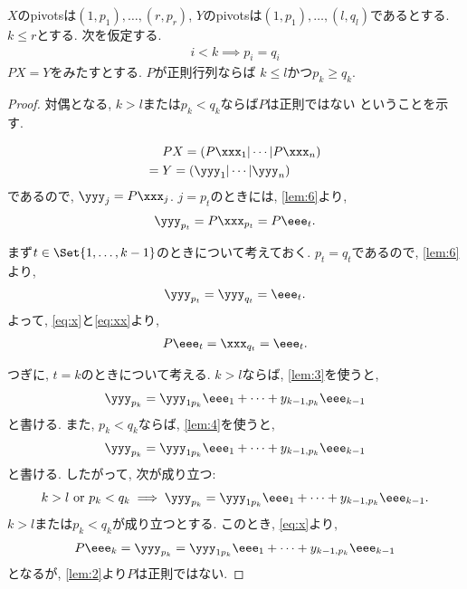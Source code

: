 \begin{lemma}
  \label{lem:8}
  $X$のpivotsは$(1,p_1),\ldots,(r,p_r)$,
  $Y$のpivotsは$(1,p_1),\ldots,(l,q_l)$であるとする.
  $k\leq r$とする.
  次を仮定する.
  \begin{align*}
    i<k \implies p_i=q_i
  \end{align*}
  $PX=Y$をみたすとする.
  $P$が正則行列ならば
  $k\leq l$かつ$p_k\geq q_k$. 
\end{lemma}
\begin{proof}
  対偶となる,
  $k> l$または$p_k< q_k$ならば$P$は正則ではない
  ということを示す.
  
  \begin{align*}
    &PX=(P\xxx_1|\cdots|P\xxx_n)\\
    ={}&Y=(\yyy_1|\cdots|\yyy_n)
  \end{align*}
  であるので, $\yyy_j=P\xxx_j$.
  $j=p_t$のときには, \cref{lem:6}より,
  \begin{align}
    \yyy_{p_t}=P\xxx_{p_t}=P\eee_t.
    \label{eq:x}
  \end{align}

  まず$t\in\Set{1,\ldots,k-1}$のときについて考えておく.
  $p_t=q_t$であるので,
  \cref{lem:6}より,
  \begin{align}
    \yyy_{p_t}=\yyy_{q_t}=\eee_t.
    \label{eq:xx}
  \end{align}
  よって, \eqref{eq:x}と\eqref{eq:xx}より,
  \begin{align*}
    P\eee_t=\xxx_{q_t}=\eee_t.
  \end{align*}


  つぎに, $t=k$のときについて考える.
  $k>l$ならば, \cref{lem:3}を使うと,
  \begin{align*}
    \yyy_{p_k}=\yyy_{1p_k}\eee_1+\cdots+y_{k-1,p_k}\eee_{k-1}
  \end{align*}
  と書ける.
  また, $p_k<q_k$ならば, \cref{lem:4}を使うと,
  \begin{align*}
    \yyy_{p_k}=\yyy_{1p_k}\eee_1+\cdots+y_{k-1,p_k}\eee_{k-1}
  \end{align*}
  と書ける.
  したがって,
  次が成り立つ:
  \begin{align*}
    k>l \text{ or } p_k<q_k
    \implies
    \yyy_{p_k}=\yyy_{1p_k}\eee_1+\cdots+y_{k-1,p_k}\eee_{k-1}.
  \end{align*}
  $k>l$または$p_k<q_k$が成り立つとする.
  このとき, \cref{eq:x}より,
  \begin{align*}
    P\eee_k
    =\yyy_{p_k}
    =\yyy_{1p_k}\eee_1+\cdots+y_{k-1,p_k}\eee_{k-1}
  \end{align*}
  となるが,
  \cref{lem:2}より$P$は正則ではない.
\end{proof}


